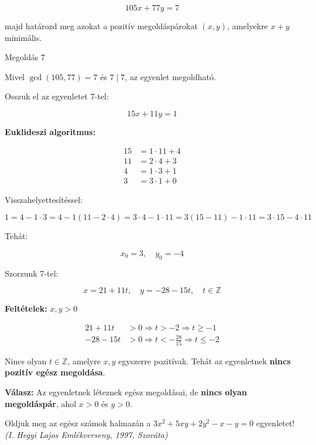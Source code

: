 \begin{solution}
\[
105x+77y=7
\]

majd határozd meg azokat a pozitív megoldáspárokat $(x,y)$, amelyekre
$x+y$ minimális.

Megoldás 7

Mivel $\gcd(105,77)=7$ és $7\mid7$, az egyenlet megoldható.

Osszuk el az egyenletet 7-tel:

\[
15x+11y=1\tag{2}
\]

\textbf{Euklideszi algoritmus:}

\begin{align*}
15 & =1\cdot11+4\\
11 & =2\cdot4+3\\
4 & =1\cdot3+1\\
3 & =3\cdot1+0
\end{align*}

Visszahelyettesítéssel:

\[
1=4-1\cdot3=4-1(11-2\cdot4)=3\cdot4-1\cdot11=3(15-11)-1\cdot11=3\cdot15-4\cdot11
\]

Tehát:

\[
x_{0}=3,\quad y_{0}=-4
\]

Szorzunk 7-tel:

\[
x=21+11t,\quad y=-28-15t,\quad t\in\mathbb{Z}
\]

\textbf{Feltételek:} $x,y>0$

\begin{align*}
21+11t & >0\Rightarrow t>-2\Rightarrow t\geq-1\\
-28-15t & >0\Rightarrow t<-\frac{28}{15}\Rightarrow t\leq-2
\end{align*}

Nincs olyan $t\in\mathbb{Z}$, amelyre $x,y$ egyszerre pozitívak.
Tehát az egyenletnek \textbf{nincs pozitív egész megoldása}.

\textbf{Válasz:} Az egyenletnek léteznek egész megoldásai, de \textbf{nincs
olyan megoldáspár}, ahol $x>0$ és $y>0$.
\end{solution}
\begin{extraproblem}
Oldjuk meg az egész számok halmazán a $3x^{2}+5xy+2y^{2}-x-y=0$
egyenletet! \emph{(I. Hegyi Lajos Emlékverseny, 1997, Szováta) }
\end{extraproblem}

